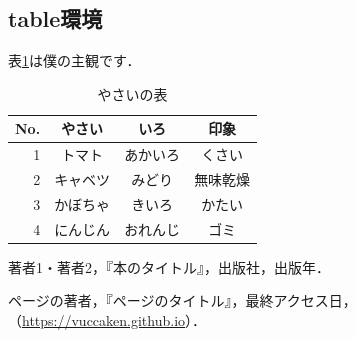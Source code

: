 \documentclass[uplatex,dvipdfmx]{vkaishi}
\begin{document}
\subsection{table環境}
表\ref{tbl:vegetable}は僕の主観です．
\begin{table}[htbp]
  \centering
  \caption{やさいの表}
  \label{tbl:vegetable}
  \begin{tabular}{r|ccc} \hline
    No. & やさい & いろ & 印象 \\ \hline
    1 & トマト & あかいろ & くさい \\
    2 & キャベツ & みどり & 無味乾燥 \\
    3 & かぼちゃ & きいろ & かたい \\
    4 & にんじん & おれんじ & ゴミ \\ \hline
  \end{tabular}
\end{table}

\begin{thebibliography}{99}
  \item 著者1・著者2，『本のタイトル』，出版社，出版年．
  \item ページの著者，『ページのタイトル』，最終アクセス日，\\
    （\url{https://vuccaken.github.io}）．
\end{thebibliography}
\end{document}
